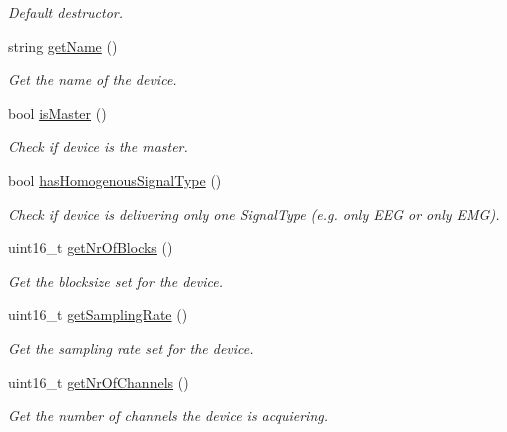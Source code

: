 \begin{DoxyCompactItemize}
\begin{DoxyCompactList}\small\item\em Default destructor. \item\end{DoxyCompactList}\item 
string \hyperlink{class_h_w_thread_a052a0eb8639dda07c3b25df7066194fa}{getName} ()
\begin{DoxyCompactList}\small\item\em Get the name of the device. \item\end{DoxyCompactList}\item 
bool \hyperlink{class_h_w_thread_a0ee653e71f6ac92c96d5d9df2bd986e1}{isMaster} ()
\begin{DoxyCompactList}\small\item\em Check if device is the master. \item\end{DoxyCompactList}\item 
bool \hyperlink{class_h_w_thread_aaab242a33f6739fae59ce7a48d892072}{hasHomogenousSignalType} ()
\begin{DoxyCompactList}\small\item\em Check if device is delivering only one SignalType (e.g. only EEG or only EMG). \item\end{DoxyCompactList}\item 
uint16\_\-t \hyperlink{class_h_w_thread_a563ffea63c9ee8878f91a7b1f04eb58a}{getNrOfBlocks} ()
\begin{DoxyCompactList}\small\item\em Get the blocksize set for the device. \item\end{DoxyCompactList}\item 
uint16\_\-t \hyperlink{class_h_w_thread_acd129796e88e58d3ef2e157e5cbdd156}{getSamplingRate} ()
\begin{DoxyCompactList}\small\item\em Get the sampling rate set for the device. \item\end{DoxyCompactList}\item 
uint16\_\-t \hyperlink{class_h_w_thread_a18e32ba3ca6621edd899196113e1e213}{getNrOfChannels} ()
\begin{DoxyCompactList}\small\item\em Get the number of channels the device is acquiering. \item\end{DoxyCompactList}\item 

\end{DoxyCompactItemize}

